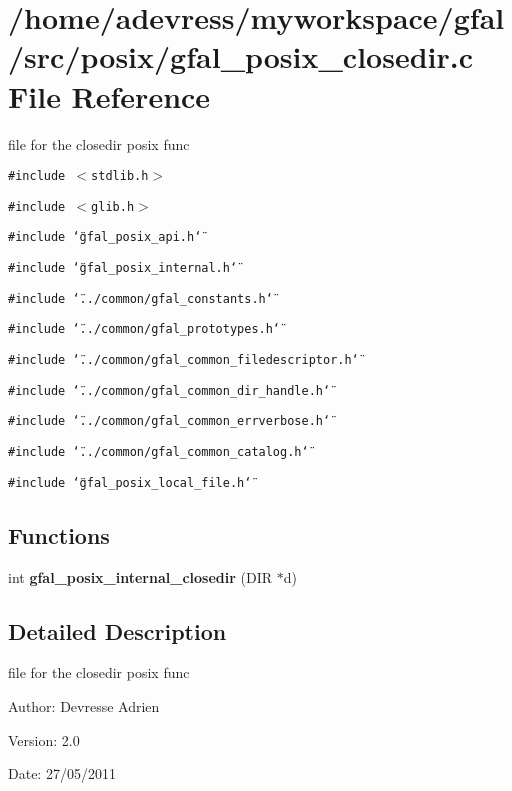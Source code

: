 \section{/home/adevress/myworkspace/gfal/src/posix/gfal\_\-posix\_\-closedir.c File Reference}
\label{gfal__posix__closedir_8c}
file for the closedir posix func 

{\tt \#include $<$stdlib.h$>$}\par
{\tt \#include $<$glib.h$>$}\par
{\tt \#include \char`\"{}gfal\_\-posix\_\-api.h\char`\"{}}\par
{\tt \#include \char`\"{}gfal\_\-posix\_\-internal.h\char`\"{}}\par
{\tt \#include \char`\"{}../common/gfal\_\-constants.h\char`\"{}}\par
{\tt \#include \char`\"{}../common/gfal\_\-prototypes.h\char`\"{}}\par
{\tt \#include \char`\"{}../common/gfal\_\-common\_\-filedescriptor.h\char`\"{}}\par
{\tt \#include \char`\"{}../common/gfal\_\-common\_\-dir\_\-handle.h\char`\"{}}\par
{\tt \#include \char`\"{}../common/gfal\_\-common\_\-errverbose.h\char`\"{}}\par
{\tt \#include \char`\"{}../common/gfal\_\-common\_\-catalog.h\char`\"{}}\par
{\tt \#include \char`\"{}gfal\_\-posix\_\-local\_\-file.h\char`\"{}}\par
\subsection*{Functions}
\begin{CompactItemize}
\item 
int \textbf{gfal\_\-posix\_\-internal\_\-closedir} (DIR $\ast$d)\label{gfal__posix__closedir_8c_3137761fa72f5cd168e84d82800a08be}

\end{CompactItemize}


\subsection{Detailed Description}
file for the closedir posix func 

\begin{Desc}
\item[Author:]Devresse Adrien \end{Desc}
\begin{Desc}
\item[Version:]2.0 \end{Desc}
\begin{Desc}
\item[Date:]27/05/2011 \end{Desc}
